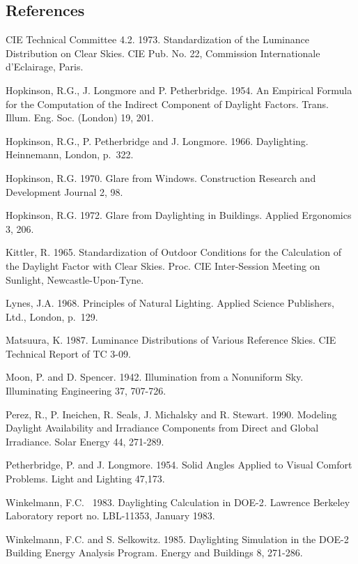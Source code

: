 \subsection{References}\label{references-045}

CIE Technical Committee 4.2. 1973. Standardization of the Luminance Distribution on Clear Skies. CIE Pub. No. 22, Commission Internationale d'Eclairage, Paris.

Hopkinson, R.G., J. Longmore and P. Petherbridge. 1954. An Empirical Formula for the Computation of the Indirect Component of Daylight Factors. Trans. Illum. Eng. Soc. (London) 19, 201.

Hopkinson, R.G., P. Petherbridge and J. Longmore. 1966. Daylighting. Heinnemann, London, p.~322.

Hopkinson, R.G. 1970. Glare from Windows. Construction Research and Development Journal 2, 98.

Hopkinson, R.G. 1972. Glare from Daylighting in Buildings. Applied Ergonomics 3, 206.

Kittler, R. 1965. Standardization of Outdoor Conditions for the Calculation of the Daylight Factor with Clear Skies. Proc. CIE Inter-Session Meeting on Sunlight, Newcastle-Upon-Tyne.

Lynes, J.A. 1968. Principles of Natural Lighting. Applied Science Publishers, Ltd., London, p.~129.

Matsuura, K. 1987. Luminance Distributions of Various Reference Skies. CIE Technical Report of TC 3-09.

Moon, P. and D. Spencer. 1942. Illumination from a Nonuniform Sky. Illuminating Engineering 37, 707-726.

Perez, R., P. Ineichen, R. Seals, J. Michalsky and R. Stewart. 1990. Modeling Daylight Availability and Irradiance Components from Direct and Global Irradiance. Solar Energy 44, 271-289.

Petherbridge, P. and J. Longmore. 1954. Solid Angles Applied to Visual Comfort Problems. Light and Lighting 47,173.

Winkelmann, F.C.~ 1983. Daylighting Calculation in DOE-2\emph{.} Lawrence Berkeley Laboratory report no. LBL-11353, January 1983.

Winkelmann, F.C. and S. Selkowitz. 1985. Daylighting Simulation in the DOE-2 Building Energy Analysis Program\emph{.} Energy and Buildings 8, 271-286.
